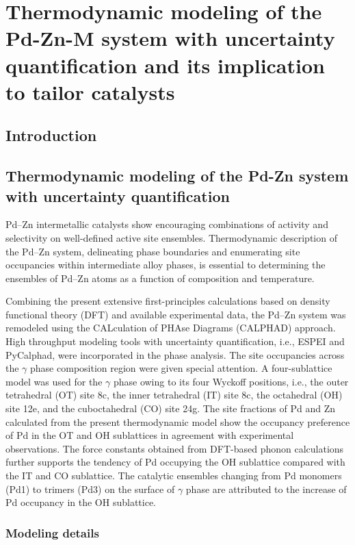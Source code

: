 \chapter{Thermodynamic modeling of the Pd-Zn-M system with uncertainty quantification and its implication to tailor catalysts} \label{chap:intermetallics}

\section{Introduction} \label{intermetallics:sec:intro}

\section{Thermodynamic modeling of the Pd-Zn system with uncertainty quantification} \label{intermetallics:sec:PdZn}
Pd–Zn intermetallic catalysts show encouraging combinations of activity and selectivity on well-defined active site ensembles. Thermodynamic description of the Pd–Zn system, delineating phase boundaries and enumerating site occupancies within intermediate alloy phases, is essential to determining the ensembles of Pd–Zn atoms as a function of composition and temperature. 

Combining the present extensive first-principles calculations based on density functional theory (DFT) and available experimental data, the Pd–Zn system was remodeled using the CALculation of PHAse Diagrams (CALPHAD) approach. High throughput modeling tools with uncertainty quantification, i.e., ESPEI and PyCalphad, were incorporated in the phase analysis. The site occupancies across the $\gamma$ phase composition region were given special attention. A four-sublattice model was used for the $\gamma$ phase owing to its four Wyckoff positions, i.e., the outer tetrahedral (OT) site 8c, the inner tetrahedral (IT) site 8c, the octahedral (OH) site 12e, and the cuboctahedral (CO) site 24g. The site fractions of Pd and Zn calculated from the present thermodynamic model show the occupancy preference of Pd in the OT and OH sublattices in agreement with experimental observations. The force constants obtained from DFT-based phonon calculations further supports the tendency of Pd occupying the OH sublattice compared with the IT and CO sublattice. The catalytic ensembles changing from Pd monomers (Pd1) to trimers (Pd3) on the surface of $\gamma$ phase are attributed to the increase of Pd occupancy in the OH sublattice.

\subsection{Modeling details} \label{intermetallics:ssec:PdZnmodel}



